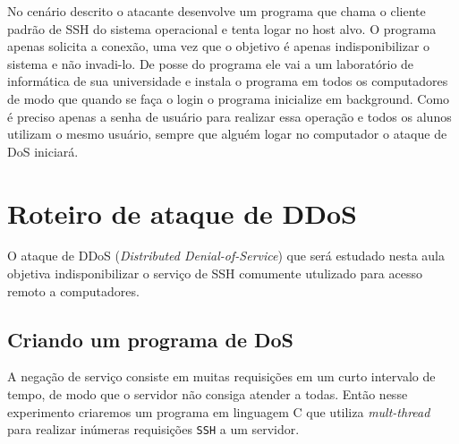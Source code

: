 \documentclass[12pt]{abnt}
\begin{document}
No cenário descrito o atacante desenvolve um programa que chama o cliente padrão de SSH do sistema operacional e tenta logar no host alvo. O programa
apenas solicita a conexão, uma vez que o objetivo é apenas indisponibilizar o sistema e não invadi-lo.
De posse do programa ele vai a um laboratório de informática de sua universidade e instala o programa em todos os computadores de modo que
quando se faça o login o programa inicialize em background. Como é preciso apenas a senha de usuário para realizar essa operação e todos
os alunos utilizam o mesmo usuário, sempre que alguém logar no computador o ataque de DoS iniciará.

\chapter{Roteiro de ataque de DDoS}

O ataque de DDoS (\textit{Distributed Denial-of-Service}) que será estudado nesta aula objetiva indisponibilizar o serviço de SSH comumente
utulizado para acesso remoto a computadores.

\section{Criando um programa de DoS}
\label{programa}

A negação de serviço consiste em muitas requisições em um curto intervalo de tempo, de modo que o servidor não consiga atender a todas. Então nesse
experimento criaremos um programa em linguagem C que utiliza \textit{mult-thread} para realizar inúmeras requisições \texttt{SSH} a um servidor.
\end{document}
